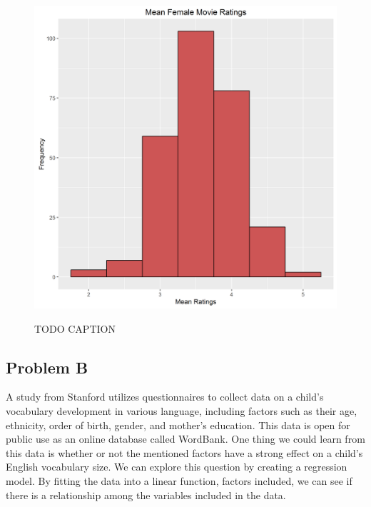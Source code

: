 \documentclass[11pt]{article}  %
\begin{document}
\begin{enumerate}
    \begin{figure}[p]
    \centering
    \caption{TODO CAPTION}
    \includegraphics[scale=.50]{femaleHistogram}
    \label{fig:femalehist}
    \end{figure}
\end{enumerate}

\newpage
{}
\newpage
\begin{center}
\section*{Problem B}
\end{center}


\indent A study from Stanford utilizes questionnaires to collect data on a child's vocabulary development in various language, including factors such as their age, ethnicity, order of birth, gender, and mother's education. This data is open for public use as an online database called WordBank. One thing we could learn from this data is whether or not the mentioned factors have a strong effect on a child's English vocabulary size. We can explore this question by creating a regression model. By fitting the data into a linear function, factors included, we can see if there is a relationship among the variables included in the data.
\end{document}
